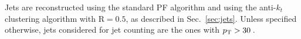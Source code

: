 Jets are reconstructed using the standard PF algorithm and using the anti-$k_t$ clustering algorithm with $\mathrm{R} = 0.5$, as described in Sec.~\ref{sec:jets}. Unless specified otherwise, jets considered for jet counting are the ones with $p_\mathrm{T} > 30$\,\GeV.

